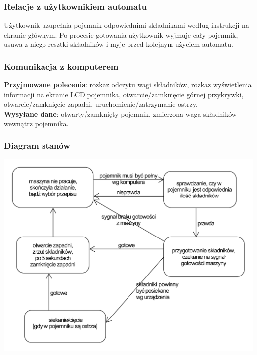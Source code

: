\documentclass[12pt,a4paper,notitlepage]{article}
\begin{document}
\subsubsection{Relacje z użytkownikiem automatu}
Użytkownik uzupełnia pojemnik odpowiednimi składnikami według instrukcji na ekranie głównym. Po procesie gotowania użytkownik wyjmuje cały pojemnik, usuwa z niego resztki składników i myje przed kolejnym użyciem automatu.

\subsubsection{Komunikacja z komputerem}
\textbf{Przyjmowane polecenia}: rozkaz odczytu wagi składników, rozkaz wyświetlenia informacji na ekranie LCD pojemnika, otwarcie/zamknięcie górnej przykrywki, otwarcie/zamknięcie zapadni, uruchomienie/zatrzymanie ostrzy.\\
\textbf{Wysyłane dane}: otwarty/zamknięty pojemnik, zmierzona waga składników wewnątrz pojemnika.

\subsubsection{Diagram stanów}
\includegraphics[width=\textwidth,height=\textheight,keepaspectratio=true]{Diagram-stanow-pojemnik.pdf}
\end{document}
